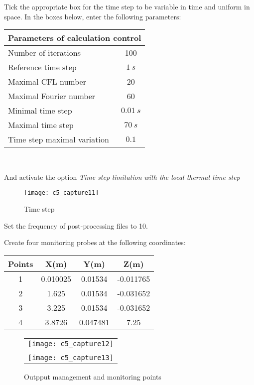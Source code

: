 \newpage
Tick the appropriate box for the time step to be variable in time and uniform in
space. In the boxes below, enter the following parameters:
\begin{center}
\begin{tabular}{|l|c|}
\hline
\multicolumn{2}{|c|}{Parameters of calculation control} \\
\hline
Number of iterations & 100 \\
\hline
Reference time step & $1\ s$ \\
\hline
Maximal CFL number & 20 \\
\hline
Maximal Fourier number & 60 \\
\hline
Minimal time step & $0.01\ s$ \\
\hline
Maximal time step & $70\ s$ \\
\hline
Time step maximal variation & $0.1$ \\
\hline
\end{tabular}\\
\end{center}

And activate the option
{\itshape Time step limitation with the local thermal time step}

\begin{figure}[h!]
\begin{center}
\texttt{[image: c5\_capture11]}
\caption{Time step}
\label{fig11_e5}
\end{center}
\end{figure}


\newpage
Set the frequency of post-processing files to 10.

Create four monitoring probes at the following coordinates:
\begin{center}
\begin{tabular}{|c|c|c|c|}
\hline
Points & X(m) & Y(m) & Z(m)\\
\hline
1 & 0.010025 & 0.01534 & -0.011765 \\
\hline
2 & 1.625 & 0.01534 & -0.031652 \\
\hline
3 & 3.225 & 0.01534 & -0.031652 \\
\hline
4 & 3.8726 & 0.047481 & 7.25 \\
\hline
\end{tabular}
\end{center}

\begin{figure}[h!]
\begin{center}
\begin{tabular}{c}
\texttt{[image: c5\_capture12]} \\
\\
\texttt{[image: c5\_capture13]}
\end{tabular}
\caption{Outpput management and monitoring points}
\label{fig12_e5}
\end{center}
\end{figure}


